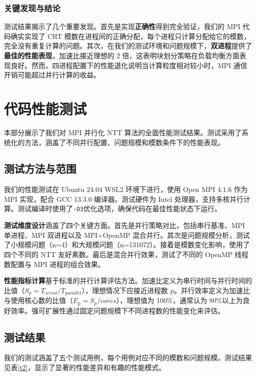 \documentclass[a4paper]{article}
\begin{document}
\subsubsection{关键发现与结论}

测试结果揭示了几个重要发现。首先是实现\textbf{正确性}得到完全验证，我们的 MPI 代码确实实现了 CRT 模数在进程间的正确分配，每个进程只计算分配给它的模数，完全没有重复计算的问题。其次，在我们的测试环境和问题规模下，\textbf{双进程}提供了\textbf{最佳的性能表现}，加速比接近理想的 2 倍，这表明块划分策略在负载均衡方面表现良好。然而，四进程配置下的性能退化说明当计算粒度相对较小时，MPI 通信开销可能超过并行计算的收益。

\section{代码性能测试}

本部分展示了我们对 MPI 并行化 NTT 算法的全面性能测试结果。测试采用了系统化的方法，涵盖了不同并行配置、问题规模和模数条件下的性能表现。

\subsection{测试方法与范围}

我们的性能测试在 Ubuntu 24.04 WSL2 环境下进行，使用 Open MPI 4.1.6 作为 MPI 实现，配合 GCC 13.3.0 编译器。测试硬件为 Intel 处理器，支持多核并行计算。测试编译时使用了\texttt{-O3}优化选项，确保代码在最佳性能状态下运行。

\textbf{测试维度设计}涵盖了四个关键方面。首先是并行策略对比，包括串行基准、MPI 单进程、MPI 双进程以及 MPI+OpenMP 混合并行。其次是问题规模分析，测试了小规模问题（n=4）和大规模问题（n=131072）。接着是模数变化影响，使用了四个不同的 NTT 友好素数。最后是混合并行效果，测试了不同的 OpenMP 线程数配置与 MPI 进程的组合效果。

\textbf{性能指标计算}基于标准的并行计算评估方法。加速比定义为串行时间与并行时间的比值（$S_p = T_{serial} / T_{parallel}$），理想情况下应接近进程数 p。并行效率定义为加速比与使用核心数的比值（$E_p = S_p / cores$），理想值为 100\%，通常认为 80\%以上为良好效率。强可扩展性通过固定问题规模下不同进程数的性能变化来评估。

\subsection{测试结果}

我们的测试涵盖了五个测试用例，每个用例对应不同的模数和问题规模。测试结果见表\ref{t2}，显示了显著的性能差异和有趣的性能模式。
\end{document}
